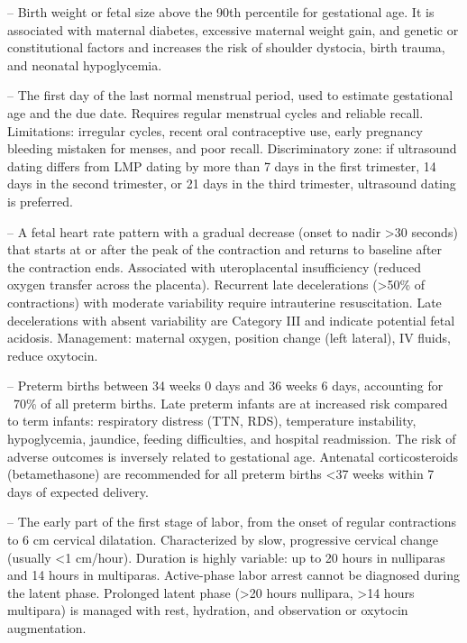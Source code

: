 -- Birth weight or fetal size above the 90th percentile for gestational age. It is associated with maternal diabetes, excessive maternal weight gain, and genetic or constitutional factors and increases the risk of shoulder dystocia, birth trauma, and neonatal hypoglycemia.

-- The first day of the last normal menstrual period, used to estimate gestational age and the due date. Requires regular menstrual cycles and reliable recall. Limitations: irregular cycles, recent oral contraceptive use, early pregnancy bleeding mistaken for menses, and poor recall. Discriminatory zone: if ultrasound dating differs from LMP dating by more than 7 days in the first trimester, 14 days in the second trimester, or 21 days in the third trimester, ultrasound dating is preferred.

-- A fetal heart rate pattern with a gradual decrease (onset to nadir >30 seconds) that starts at or after the peak of the contraction and returns to baseline after the contraction ends. Associated with uteroplacental insufficiency (reduced oxygen transfer across the placenta). Recurrent late decelerations (>50\% of contractions) with moderate variability require intrauterine resuscitation. Late decelerations with absent variability are Category III and indicate potential fetal acidosis. Management: maternal oxygen, position change (left lateral), IV fluids, reduce oxytocin.

-- Preterm births between 34 weeks 0 days and 36 weeks 6 days, accounting for ~70\% of all preterm births. Late preterm infants are at increased risk compared to term infants: respiratory distress (TTN, RDS), temperature instability, hypoglycemia, jaundice, feeding difficulties, and hospital readmission. The risk of adverse outcomes is inversely related to gestational age. Antenatal corticosteroids (betamethasone) are recommended for all preterm births <37 weeks within 7 days of expected delivery.

-- The early part of the first stage of labor, from the onset of regular contractions to 6 cm cervical dilatation. Characterized by slow, progressive cervical change (usually <1 cm/hour). Duration is highly variable: up to 20 hours in nulliparas and 14 hours in multiparas. Active-phase labor arrest cannot be diagnosed during the latent phase. Prolonged latent phase (>20 hours nullipara, >14 hours multipara) is managed with rest, hydration, and observation or oxytocin augmentation.


